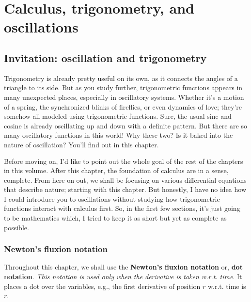\chapter{Calculus, trigonometry, and oscillations}
\label{sec:calculus-and-trigonometry}


\section{Invitation: oscillation and trigonometry}

Trigonometry is already pretty useful on its own, as it connects the angles of a triangle to its side. But as you study further, trigonometric functions appears in many unexpected places, especially in oscillatory systems. Whether it's a motion of a spring, the synchronized blinks of fireflies, or even dynamics of love; they're somehow all modeled using trigonometric functions. Sure, the usual sine and cosine is already oscillating up and down with a definite pattern. But there are so many oscillatory functions in this world! Why these two? Is it baked into the nature of oscillation? You'll find out in this chapter.

Before moving on, I'd like to point out the whole goal of the rest of the chapters in this volume. After this chapter, the foundation of calculus are in a sense, complete. From here on out, we shall be focusing on various differential equations that describe nature; starting with this chapter. But honestly, I have no idea how I could introduce you to oscillations without studying how trigonometric functions interact with calculus first. So, in the first few sections, it's just going to be mathematics which, I tried to keep it as short but yet as complete as possible.

\subsection{Newton's fluxion notation}
\label{sec:newton-fluxion}

Throughout this chapter, we shall use the \textbf{Newton's fluxion notation} or, \textbf{dot notation}. \emph{This notation is used only when the derivative is taken w.r.t. time}. It places a dot over the variables, e.g., the first derivative of position \(r\) w.r.t. time is \(\dot{r}\).

